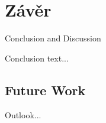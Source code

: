 \chapter{Závěr} \label{chap:conclusion}

Conclusion and Discussion

Conclusion text...

\section{Future Work} \label{sec:future_work}
Outlook...